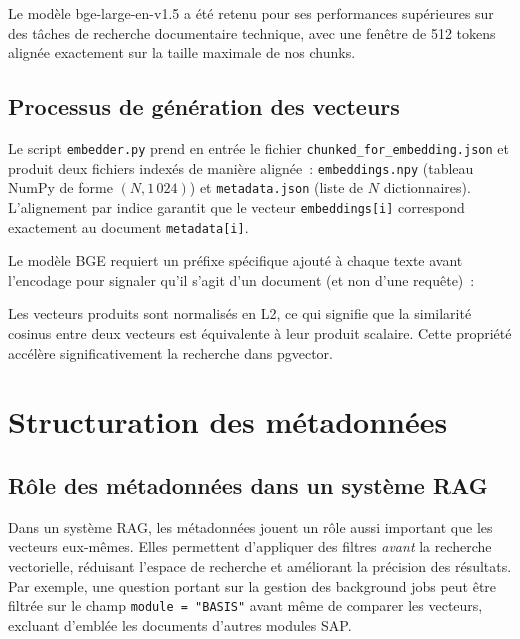 Le modèle bge-large-en-v1.5 a été retenu pour ses performances supérieures sur des tâches
de recherche documentaire technique, avec une fenêtre de 512 tokens alignée exactement sur
la taille maximale de nos chunks.

\subsection{Processus de génération des vecteurs}

Le script \texttt{embedder.py} prend en entrée le fichier
\texttt{chunked\_for\_embedding.json} et produit deux fichiers indexés de manière alignée~:
\texttt{embeddings.npy} (tableau NumPy de forme $(N, 1\,024)$) et \texttt{metadata.json}
(liste de $N$ dictionnaires). L'alignement par indice garantit que le vecteur
\texttt{embeddings[i]} correspond exactement au document \texttt{metadata[i]}.

Le modèle BGE requiert un préfixe spécifique ajouté à chaque texte avant l'encodage pour
signaler qu'il s'agit d'un document (et non d'une requête)~:



Les vecteurs produits sont normalisés en L2, ce qui signifie que la similarité cosinus
entre deux vecteurs est équivalente à leur produit scalaire. Cette propriété accélère
significativement la recherche dans pgvector.


\section{Structuration des métadonnées}
\label{sec:metadonnees}

\subsection{Rôle des métadonnées dans un système RAG}

Dans un système RAG, les métadonnées jouent un rôle aussi important que les vecteurs
eux-mêmes. Elles permettent d'appliquer des filtres \textit{avant} la recherche vectorielle,
réduisant l'espace de recherche et améliorant la précision des résultats. Par exemple, une
question portant sur la gestion des background jobs peut être filtrée sur le champ
\texttt{module = "BASIS"} avant même de comparer les vecteurs, excluant d'emblée les
documents d'autres modules SAP.

